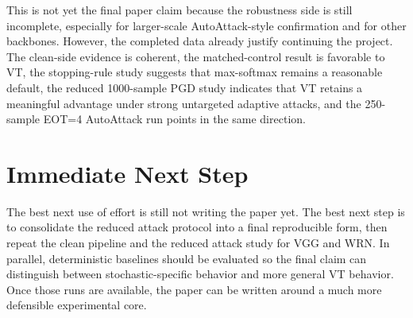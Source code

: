\documentclass[11pt]{article}
\begin{document}
This is not yet the final paper claim because the robustness side is still incomplete, especially for larger-scale AutoAttack-style confirmation and for other backbones. However, the completed data already justify continuing the project. The clean-side evidence is coherent, the matched-control result is favorable to VT, the stopping-rule study suggests that max-softmax remains a reasonable default, the reduced 1000-sample PGD study indicates that VT retains a meaningful advantage under strong untargeted adaptive attacks, and the 250-sample EOT=4 AutoAttack run points in the same direction.

\section{Immediate Next Step}
The best next use of effort is still not writing the paper yet. The best next step is to consolidate the reduced attack protocol into a final reproducible form, then repeat the clean pipeline and the reduced attack study for VGG and WRN. In parallel, deterministic baselines should be evaluated so the final claim can distinguish between stochastic-specific behavior and more general VT behavior. Once those runs are available, the paper can be written around a much more defensible experimental core.
\end{document}
